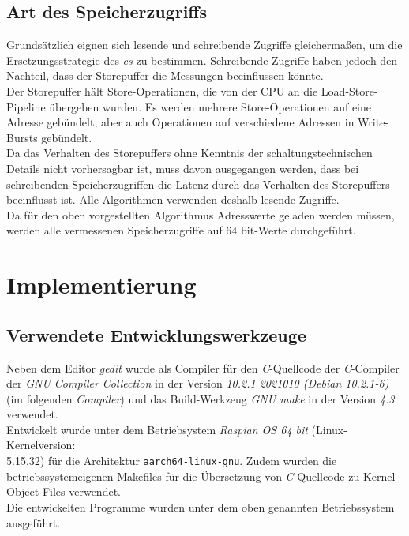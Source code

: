 \documentclass[]{scrbook}
\begin{document}
\subsection{Art des Speicherzugriffs}

Grundsätzlich eignen sich lesende und schreibende Zugriffe gleichermaßen, um die Ersetzungsstrategie des \textsl{\gls{c}s} zu bestimmen.
Schreibende Zugriffe haben jedoch den Nachteil, dass der Storepuffer die Messungen beeinflussen könnte.
\\
Der Storepuffer hält Store-Operationen, die von der CPU an die Load-Store-Pipeline übergeben wurden.
Es werden mehrere Store-Operationen auf eine Adresse gebündelt, aber auch Operationen auf verschiedene Adressen in Write-Bursts gebündelt. \cite[S.\,28]{a53trm}
\\
Da das Verhalten des Storepuffers ohne Kenntnis der schaltungstechnischen Details nicht vorhersagbar ist, muss davon ausgegangen werden, dass bei schreibenden Speicherzugriffen die Latenz durch das Verhalten des Storepuffers beeinflusst ist.
Alle Algorithmen verwenden deshalb lesende Zugriffe.
\\
Da für den oben vorgestellten Algorithmus Adresswerte geladen werden müssen, werden alle vermessenen Speicherzugriffe auf $64 \textrm{ bit}$-Werte durchgeführt.

\section{Implementierung}

\subsection{Verwendete Entwicklungswerkzeuge}

Neben dem Editor \textit{gedit} wurde als Compiler für den \textit{C}-Quellcode der \textit{C}-Compiler der \textit{GNU Compiler Collection} in der Version \textit{10.2.1 2021010 (Debian 10.2.1-6)} (im folgenden \textsl{Compiler}) und das Build-Werkzeug \textit{GNU make} in der Version \textit{4.3} verwendet.\\
Entwickelt wurde unter dem Betriebsystem \textit{Raspian OS 64 bit} (Linux-Kernelversion:\\ 5.15.32) für die Architektur \texttt{aarch64-linux-gnu}.
Zudem wurden die betriebssystemeigenen Makefiles für die Übersetzung von \textit{C}-Quellcode zu Kernel-Object-Files
verwendet.\\
Die entwickelten Programme wurden unter dem oben genannten Betriebssystem ausgeführt.
\end{document}
